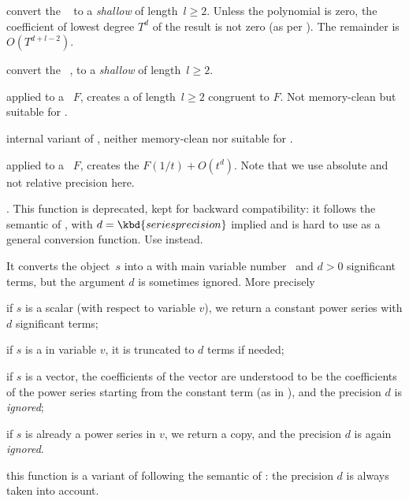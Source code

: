  convert the ~ to
a \emph{shallow}  of length~$l\geq 2$.
Unless the polynomial is zero, the coefficient of lowest degree
$T^d$ of the result is not zero (as per ). The
remainder is $O(T^{d+l-2})$.

 convert the ~,
to a \emph{shallow}  of length~$l\geq 2$.

 applied to a ~$F$,
creates a  of length~$l\geq 2$ congruent to $F$. Not memory-clean
but suitable for .

 internal variant of
, neither memory-clean nor suitable for
.

 applied to a
~$F$, creates the  $F(1/t) + O(t^d)$. Note that
we use absolute and not relative precision here.

. This function is deprecated,
kept for backward compatibility: it follows the semantic of ,
with $d = \kbd{seriesprecision}$ implied and is hard to use as a general
conversion function. Use  instead.

It converts the object~$s$ into a  with main variable number~
and $d > 0$ significant terms, but the argument $d$ is sometimes ignored.
More precisely

\item if $s$ is a scalar (with respect to variable $v$),  we return a
constant power series with $d$ significant terms;

\item if $s$ is a  in variable $v$, it is truncated to $d$ terms if
needed;

\item if $s$ is a vector, the coefficients of the vector  are understood to
be the coefficients of the power series starting from the constant term (as
in ), and the precision $d$ is \emph{ignored};

\item if $s$ is already a power series in $v$, we return a copy, and
the precision $d$ is again \emph{ignored}.

 this function is a variant of
 following the semantic of : the precision $d$
is always taken into account.

